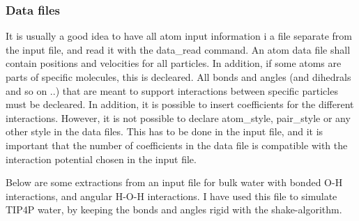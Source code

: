 \subsubsection{Data files}
It is usually a good idea to have all atom input information i a file separate from the input file, and read it with the data\_read command. An atom data file shall contain positions and velocities for all particles. In addition, if some atoms are parts of specific molecules, this is decleared. All bonds and angles (and dihedrals and so on ..) that are meant to support interactions between specific particles must be decleared. In addition, it is possible to insert coefficients for the different interactions. However, it is not possible to declare atom\_style, pair\_style or any other style in the data files. This has to be done in the input file, and it is important that the number of coefficients in the data file is compatible with the interaction potential chosen in the input file. 

Below are some extractions from an input file for bulk water with bonded O-H interactions, and angular H-O-H interactions. I have used this file to simulate TIP4P water, by keeping the bonds and angles rigid with the shake-algorithm. 

